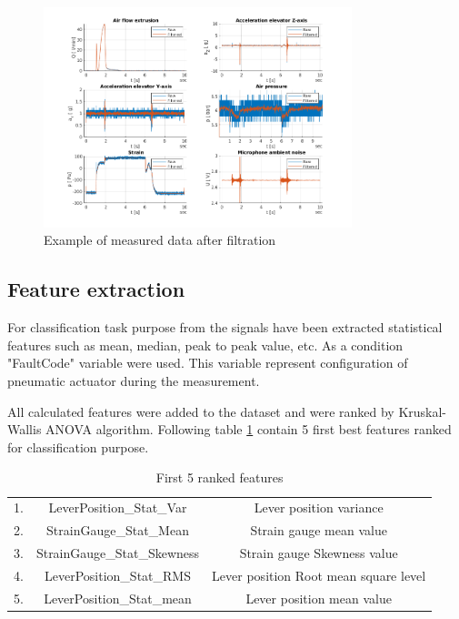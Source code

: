 \documentclass[class=article, crop=false]{standalone}
\begin{document}
\begin{figure}[h!]
    \centering
    \includegraphics[width=0.8\textwidth]{preprocessed_data.png}
    \caption{Example of measured data after filtration}
    \label{fig:preprocess}
\end{figure}


\subsection{Feature extraction}

For classification task purpose from the signals have been extracted
statistical features such as mean, median, peak to peak value, etc.
As a condition "FaultCode" variable
were used. This variable represent configuration of pneumatic actuator
during the measurement.

All calculated features were added to the dataset and were ranked by
Kruskal-Wallis ANOVA algorithm. Following table \ref{tab:feat} contain
5 first best features ranked for classification purpose.

\begin{table}[h]
    \centering
    \begin{tabular}{|c|c|c|}
        \hline
        1. & LeverPosition\_Stat\_Var & Lever position variance \\
        2. & StrainGauge\_Stat\_Mean  & Strain gauge mean value \\
        3. & StrainGauge\_Stat\_Skewness  & Strain gauge Skewness value \\
        4. & LeverPosition\_Stat\_RMS  & Lever position Root mean square
        level \\
        5. & LeverPosition\_Stat\_mean  & Lever position mean value \\ 
        \hline
    \end{tabular}
    \caption{First 5 ranked features}
    \label{tab:feat}
\end{table}
\end{document}
